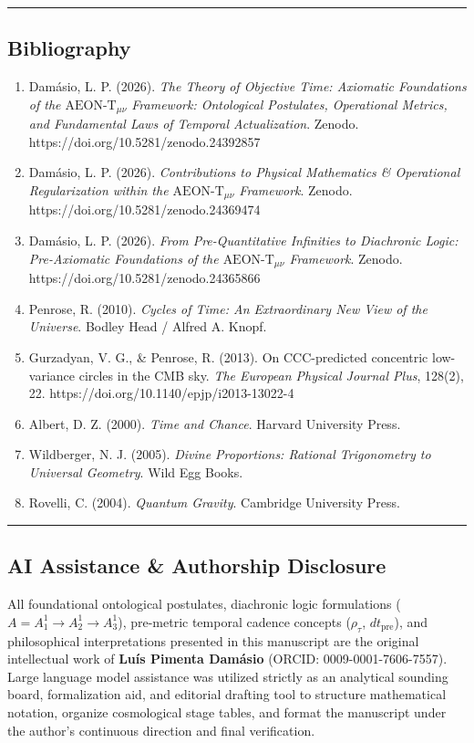 \documentclass[
]{article}
\providecommand{\tightlist}{%
  \setlength{\itemsep}{0pt}\setlength{\parskip}{0pt}}
\begin{document}
\begin{center}\rule{0.5\linewidth}{0.5pt}\end{center}

\subsection{Bibliography}\label{bibliography}

\begin{enumerate}
\def\labelenumi{\arabic{enumi}.}
\tightlist
\item
  Damásio, L. P. (2026). \emph{The Theory of Objective Time: Axiomatic
  Foundations of the \(\text{AEON-T}_{\mu\nu}\) Framework: Ontological
  Postulates, Operational Metrics, and Fundamental Laws of Temporal
  Actualization}. Zenodo. https://doi.org/10.5281/zenodo.24392857
\item
  Damásio, L. P. (2026). \emph{Contributions to Physical Mathematics \&
  Operational Regularization within the \(\text{AEON-T}_{\mu\nu}\)
  Framework}. Zenodo. https://doi.org/10.5281/zenodo.24369474
\item
  Damásio, L. P. (2026). \emph{From Pre-Quantitative Infinities to
  Diachronic Logic: Pre-Axiomatic Foundations of the
  \(\text{AEON-T}_{\mu\nu}\) Framework}. Zenodo.
  https://doi.org/10.5281/zenodo.24365866
\item
  Penrose, R. (2010). \emph{Cycles of Time: An Extraordinary New View of
  the Universe}. Bodley Head / Alfred A. Knopf.
\item
  Gurzadyan, V. G., \& Penrose, R. (2013). On CCC-predicted concentric
  low-variance circles in the CMB sky. \emph{The European Physical
  Journal Plus}, 128(2), 22. https://doi.org/10.1140/epjp/i2013-13022-4
\item
  Albert, D. Z. (2000). \emph{Time and Chance}. Harvard University
  Press.
\item
  Wildberger, N. J. (2005). \emph{Divine Proportions: Rational
  Trigonometry to Universal Geometry}. Wild Egg Books.
\item
  Rovelli, C. (2004). \emph{Quantum Gravity}. Cambridge University
  Press.
\end{enumerate}

\begin{center}\rule{0.5\linewidth}{0.5pt}\end{center}

\subsection{AI Assistance \& Authorship
Disclosure}\label{ai-assistance-authorship-disclosure}

All foundational ontological postulates, diachronic logic formulations
(\(A = A_1^1 \to A_2^1 \to A_3^1\)), pre-metric temporal cadence
concepts (\(\rho_\tau\), \(dt_{\mathrm{pre}}\)), and philosophical
interpretations presented in this manuscript are the original
intellectual work of \textbf{Luís Pimenta Damásio} (ORCID:
0009-0001-7606-7557). Large language model assistance was utilized
strictly as an analytical sounding board, formalization aid, and
editorial drafting tool to structure mathematical notation, organize
cosmological stage tables, and format the manuscript under the author's
continuous direction and final verification.
\end{document}
